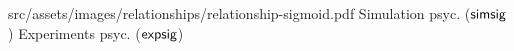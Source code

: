 
\relatplot
{src/assets/images/relationships/relationship-sigmoid.pdf}
{Simulation psyc. ($\mathsf{simsig}$)}
{Experiments psyc. ($\mathsf{expsig}$)}